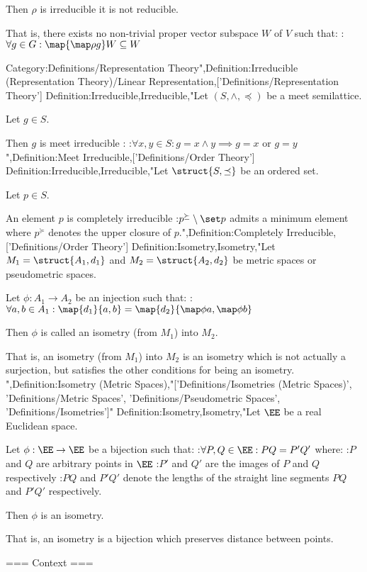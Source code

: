 Then $\rho$ is irreducible  it is not reducible.


That is,  there exists no non-trivial proper vector subspace $W$ of $V$ such that:
: $\forall g \in G: \map {\map \rho g} W \subseteq W$


Category:Definitions/Representation Theory",Definition:Irreducible (Representation Theory)/Linear Representation,['Definitions/Representation Theory']
Definition:Irreducible,Irreducible,"Let $\left({S, \wedge, \preceq}\right)$ be a meet semilattice.

Let $g \in S$.


Then $g$ is meet irreducible :
:$\forall x, y \in S: g = x \wedge y \implies g = x$ or $g = y$",Definition:Meet Irreducible,['Definitions/Order Theory']
Definition:Irreducible,Irreducible,"Let $\struct {S, \preceq}$ be an ordered set.

Let $p \in S$.

An element $p$ is completely irreducible 
:$p^\succeq \setminus \set p$ admits a minimum element
where $p^\succeq$ denotes the upper closure of $p$.",Definition:Completely Irreducible,['Definitions/Order Theory']
Definition:Isometry,Isometry,"Let $M_1 = \struct {A_1, d_1}$ and $M_2 = \struct {A_2, d_2}$ be metric spaces or pseudometric spaces.


Let $\phi: A_1 \to A_2$ be an injection such that:
:$\forall a, b \in A_1: \map {d_1} {a, b} = \map {d_2} {\map \phi a, \map \phi b}$


Then $\phi$ is called an isometry (from $M_1$) into $M_2$.


That is, an isometry (from $M_1$) into $M_2$ is an isometry which is not actually a surjection, but satisfies the other conditions for being an isometry.
",Definition:Isometry (Metric Spaces),"['Definitions/Isometries (Metric Spaces)', 'Definitions/Metric Spaces', 'Definitions/Pseudometric Spaces', 'Definitions/Isometries']"
Definition:Isometry,Isometry,"Let $\EE$ be a real Euclidean space.


Let $\phi: \EE \to \EE$ be a bijection such that:
:$\forall P, Q \in \EE: PQ = P'Q'$
where:
:$P$ and $Q$ are arbitrary points in $\EE$
:$P'$ and $Q'$ are the images of $P$ and $Q$ respectively
:$PQ$ and $P'Q'$ denote the lengths of the straight line segments $PQ$ and $P'Q'$ respectively.


Then $\phi$ is an isometry.


That is, an isometry is a bijection which preserves distance between points.


=== Context ===

